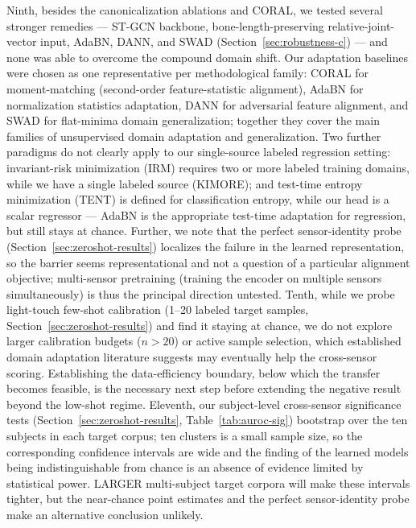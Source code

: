 \documentclass[10pt,journal]{IEEEtran}
\begin{document}
Ninth, besides the canonicalization ablations and CORAL, we tested several stronger remedies --- ST-GCN backbone, bone-length-preserving relative-joint-vector input, AdaBN, DANN, and SWAD (Section~\ref{sec:robustness-c}) --- and none was able to overcome the compound domain shift. Our adaptation baselines were chosen as one representative per methodological family: CORAL \cite{sun2016deep} for moment-matching (second-order feature-statistic alignment), AdaBN \cite{li2018adabn} for normalization statistics adaptation, DANN \cite{ganin2016dann} for adversarial feature alignment, and SWAD \cite{cha2021swad} for flat-minima domain generalization; together they cover the main families of unsupervised domain adaptation and generalization. Two further paradigms do not clearly apply to our single-source labeled regression setting: invariant-risk minimization (IRM) \cite{arjovsky2019irm} requires two or more labeled training domains, while we have a single labeled source (KIMORE); and test-time entropy minimization (TENT) \cite{wang2021tent} is defined for classification entropy, while our head is a scalar regressor --- AdaBN is the appropriate test-time adaptation for regression, but still stays at chance. Further, we note that the perfect sensor-identity probe (Section~\ref{sec:zeroshot-results}) localizes the failure in the learned representation, so the barrier seems representational and not a question of a particular alignment objective; multi-sensor pretraining (training the encoder on multiple sensors simultaneously) is thus the principal direction untested. Tenth, while we probe light-touch few-shot calibration (1--20 labeled target samples, Section~\ref{sec:zeroshot-results}) and find it staying at chance, we do not explore larger calibration budgets ($n > 20$) or active sample selection, which established domain adaptation literature suggests may eventually help the cross-sensor scoring. Establishing the data-efficiency boundary, below which the transfer becomes feasible, is the necessary next step before extending the negative result beyond the low-shot regime. Eleventh, our subject-level cross-sensor significance tests (Section~\ref{sec:zeroshot-results}, Table~\ref{tab:auroc-sig}) bootstrap over the ten subjects in each target corpus; ten clusters is a small sample size, so the corresponding confidence intervals are wide and the finding of the learned models being indistinguishable from chance is an absence of evidence limited by statistical power. LARGER multi-subject target corpora will make these intervals tighter, but the near-chance point estimates and the perfect sensor-identity probe make an alternative conclusion unlikely.
\end{document}
